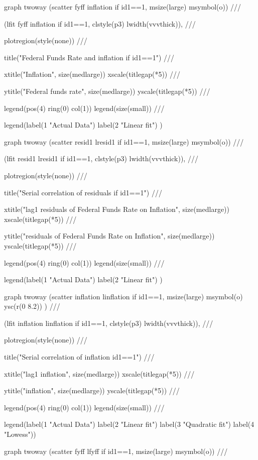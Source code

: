 \documentclass[12pt,a4paper]{article}%
\begin{document}
graph twoway (scatter fyff inflation if id1==1, msize(large) msymbol(o)) ///

(lfit fyff inflation if id1==1, clstyle(p3) lwidth(vvvthick)), ///

plotregion(style(none)) ///

title("Federal Funds Rate and inflation if id1==1") ///

xtitle("Inflation", size(medlarge)) xscale(titlegap(*5)) ///

ytitle("Federal funds rate", size(medlarge)) yscale(titlegap(*5)) ///

legend(pos(4) ring(0) col(1)) legend(size(small)) ///

legend(label(1 "Actual Data") label(2 "Linear fit") )

graph twoway (scatter resid1 lresid1 if id1==1, msize(large) msymbol(o)) ///

(lfit resid1 lresid1 if id1==1, clstyle(p3) lwidth(vvvthick)), ///

plotregion(style(none)) ///

title("Serial correlation of residuals if id1==1") ///

xtitle("lag1 residuals of Federal Funds Rate on Inflation", size(medlarge))
xscale(titlegap(*5)) ///

ytitle("residuals of Federal Funds Rate on Inflation", size(medlarge))
yscale(titlegap(*5)) ///

legend(pos(4) ring(0) col(1)) legend(size(small)) ///

legend(label(1 "Actual Data") label(2 "Linear fit") )

graph twoway (scatter inflation linflation if id1==1, msize(large) msymbol(o)
ysc(r(0 8.2)) ) ///

(lfit inflation linflation if id1==1, clstyle(p3) lwidth(vvvthick)), ///

plotregion(style(none)) ///

title("Serial correlation of inflation id1==1") ///

xtitle("lag1 inflation", size(medlarge)) xscale(titlegap(*5)) ///

ytitle("inflation", size(medlarge)) yscale(titlegap(*5)) ///

legend(pos(4) ring(0) col(1)) legend(size(small)) ///

legend(label(1 "Actual Data") label(2 "Linear fit") label(3 "Quadratic fit")
label(4 "Lowess"))

graph twoway (scatter fyff lfyff if id1==1, msize(large) msymbol(o)) ///
\end{document}
